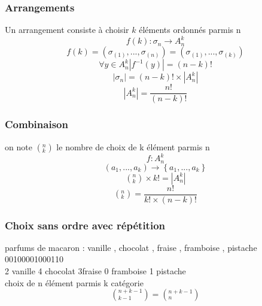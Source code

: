 \documentclass{report}
\begin{document}
\subsubsection{Arrangements}
Un arrangement consiste à choisir $k$ éléments ordonnés parmis n\\
$$f(k): \sigma_n \rightarrow A^k_n$$
$$f(k)=\left(\sigma_{(1)},...,\sigma_{(n)}\right)=\left(\sigma_{(1)},...,\sigma_{(k)}\right)$$
$$\forall y \in A^k_n \left|f^{-1}(y)\right|=(n-k)!$$
$$\left|\sigma_n\right|=(n-k)!\times \left|A^k_n\right|$$
$$\left|A^k_n\right|=\frac{n!}{(n-k)!}$$
\subsubsection{Combinaison}
on note $\left(^n_k\right)$ le nombre de choix de k élément parmis n\\
$$f: A^k_n$$
$$\left(a_1,...,a_k\right)\rightarrow\left\{a_1,...,a_k\right\}$$
$$\left(^n_k\right) \times k!= \left|A^k_n\right|$$
$$\left(^n_k\right) = \frac{n!}{k! \times (n-k)!}$$
\subsubsection{Choix sans ordre avec répétition}
parfums de macaron : vanille , chocolat , fraise , framboise , pistache\\
00100001000110\\
2 vanille 4 chocolat 3fraise 0 framboise 1 pistache\\
choix de n élément parmis k catégorie\\
$$\left(^{n+k-1}_{k-1}\right)=\left(^{n+k-1}_{n}\right)$$
\end{document}
